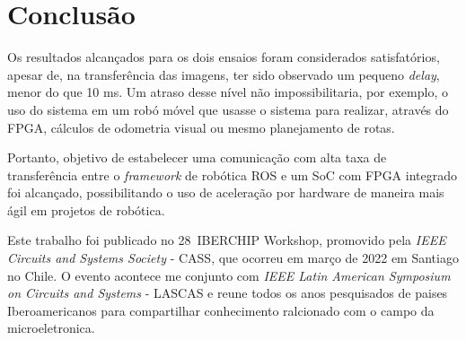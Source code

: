 \chapter{Conclusão}\label{cap:conclusao}

Os resultados alcançados para os dois ensaios foram considerados satisfatórios, apesar de, na transferência das imagens, ter sido observado um pequeno \textit{delay}, menor do que 10 ms. Um atraso desse nível não impossibilitaria, por exemplo, o uso do sistema em um robó móvel que usasse o sistema para realizar, através do FPGA, cálculos de odometria visual ou mesmo planejamento de rotas. 

Portanto,  objetivo de estabelecer uma comunicação com alta taxa de transferência entre o \textit{framework} de robótica ROS e um SoC com FPGA integrado foi alcançado, possibilitando o uso de aceleração por hardware de maneira mais ágil em projetos de robótica.

Este trabalho foi publicado no 28\textordmasculine~IBERCHIP Workshop, promovido pela \textit{IEEE Circuits and Systems Society} - CASS, que ocorreu em março de 2022 em Santiago no Chile. O evento acontece me conjunto com \textit{IEEE Latin American Symposium on Circuits and Systems} - LASCAS e reune todos os anos pesquisados de paises Iberoamericanos para compartilhar conhecimento ralcionado com o campo da microeletronica.
